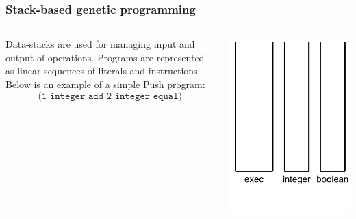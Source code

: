 \documentclass{beamer}
\newcommand{\linespace}{\vskip 0.25cm}
\begin{document}
\begin{frame}
	\frametitle{Stack-based genetic programming}
	\begin{columns}
		\begin{column}{0.65\textwidth}
			Data-stacks are used for managing input and output of operations.
			\linespace
			\linespace
			\linespace
			\pause Programs are represented as linear sequences of literals and instructions. Below is an example of a simple Push program:
			\[\texttt{(1 integer\_add 2 integer\_equal)}\]
		\end{column}
	\begin{column}{0.35\textwidth}
		\centering
		\pause[0] \includegraphics[height=.7\textheight]{Illustrations/empty_stacks.PDF}
	\end{column}
	\end{columns}
\end{frame}
\end{document}
